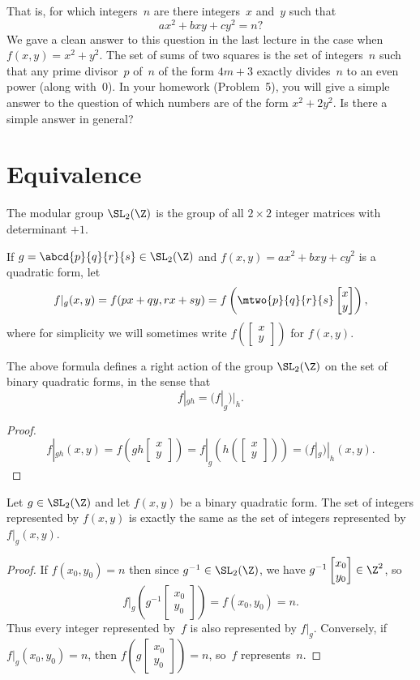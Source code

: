 \documentclass[11pt]{report}
\renewcommand{\vtwo}[2]{\left[
        \begin{matrix}#1\\#2
        \end{matrix}\right]}
\begin{document}
That is, for which integers~$n$ are there integers~$x$ and~$y$ such
that
$$
  ax^2 + bxy + cy^2 = n?
$$
We gave a clean answer to this question in the last lecture
in the case when $f(x,y) = x^2 + y^2$.  The set
of sums of two squares is the set of integers~$n$
such that any prime divisor~$p$ of~$n$ of the form $4m+3$ exactly
divides~$n$ to an even power (along with~$0$).
In your homework (Problem~5), you will give a simple answer to
the question of which numbers are of the form $x^2+2y^2$.
Is there a simple answer in general?

\section{Equivalence}
\begin{definition}
  The modular group $\SL_2(\Z)$ is the group of all $2\times 2$
  integer matrices with determinant $+1$.
\end{definition}
If $g=\abcd{p}{q}{r}{s}\in\SL_2(\Z)$ and
$f(x,y)=ax^2 + bxy+cy^2$ is a quadratic form, let
$$
  f|_g (x,y)= f(px+qy, rx+sy) =
  f\left(\mtwo{p}{q}{r}{s}\vtwo{x}{y}\right),
$$
where for simplicity we will sometimes write
$f\left(\vtwo{x}{y}\right)$ for $f(x,y)$.
\begin{proposition}
  The above formula defines a right action of the group $\SL_2(\Z)$
  on the set of binary quadratic forms, in the sense that
  $$
    f|_{gh} = (f|_g)|_h.
  $$
\end{proposition}
\begin{proof}
  $$
    f|_{gh}(x,y) = f\left(gh\vtwo{x}{y}\right)
    = f|_g\left(h\left(\vtwo{x}{y}\right)\right)
    = (f|_g)|_h(x,y).
  $$
\end{proof}

\begin{proposition}\label{prop:samerep}
  Let $g\in\SL_2(\Z)$ and let $f(x,y)$ be a binary quadratic form.
  The set of integers represented by $f(x,y)$ is exactly the same
  as the set of integers represented by $f|_g(x,y)$.
\end{proposition}
\begin{proof}
  If $f(x_0, y_0)=n$  then
  since $g^{-1}\in\SL_2(\Z)$, we have $g^{-1}\vtwo{x_0}{y_0}\in\Z^2$, so
  $$
    f|_g\left(g^{-1}\vtwo{x_0}{y_0}\right) = f (x_0, y_0) = n.
  $$
  Thus every integer represented by~$f$ is also represented by $f|_g$.
  Conversely, if $f|_g(x_0,y_0)=n$, then
  $f\left(g\vtwo{x_0}{y_0}\right) = n$,
  so~$f$ represents~$n$.
\end{proof}
\end{document}
